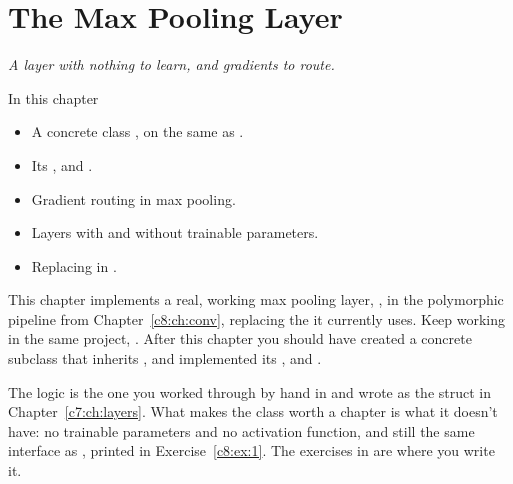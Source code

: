 
\chapter{The Max Pooling Layer}
\label{c9:ch:maxpool}

{\large\itshape A layer with nothing to learn, and gradients to route.\par}

\begin{chapterbox}{In this chapter}
\begin{itemize}
  \item A concrete class , on the same 
    as .
  \item Its ,  and .
  \item Gradient routing in max pooling.
  \item Layers with and without trainable parameters.
  \item Replacing  in .
\end{itemize}
\end{chapterbox}

This chapter implements a real, working max pooling layer, , in the
polymorphic  pipeline from Chapter~\ref{c8:ch:conv}, replacing the
 it currently uses. Keep working in the same project,
. After this chapter you should have created a concrete subclass
 that inherits , and implemented its
,  and .

The logic is the one you worked through by hand in  and wrote as the
struct  in Chapter~\ref{c7:ch:layers}. What makes the class worth a chapter
is what it doesn't have: no trainable parameters and no activation function, and still the same
interface as , printed in Exercise~\ref{c8:ex:1}. The exercises in
 are where you write it.



